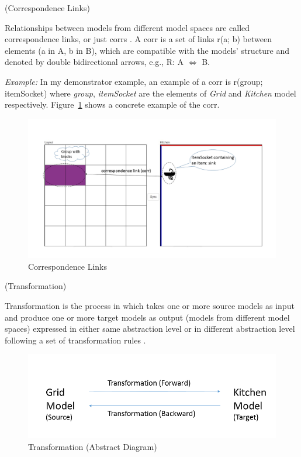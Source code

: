 \begin{defn}\label{defCorrespondenceLinks } (Correspondence Links) \end{defn}
Relationships between models from different model spaces are called correspondence links, or just corrs \cite{benchmarx-reload}. A corr is a set of links  r(a; b) between elements (a in A, b in B), which are compatible with the models' structure and denoted by double bidirectional arrows, e.g., R: A $\Longleftrightarrow$ B. 

\textit{Example:} In my demonstrator example, an example of a corr is r(group; itemSocket) where \textit{group}, \textit{itemSocket} are the elements of \textit{Grid} and \textit{Kitchen} model respectively. Figure~\ref{fig:Correspondence_Links} shows a concrete example of the corr.\\
\begin{figure}
	\includegraphics[width=1\textwidth]{figures/Corr}
	\caption{Correspondence Links}
	\label{fig:Correspondence_Links}
\end{figure}

\begin{defn}\label{defTransformation } (Transformation) \end{defn}
Transformation is the process in which takes one or more source models as input and produce one or more target models as output (models from different model spaces) expressed in either same abstraction level or in different abstraction level following a set of transformation rules \cite{modeltransform}.\\

\begin{figure}
	\includegraphics[width=1\textwidth]{figures/Transformation_Abstract}
	\caption{Transformation (Abstract Diagram)}
	\label{fig:Transformation_Abstract}
\end{figure}

